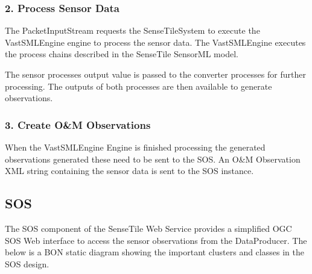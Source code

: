 \documentclass[]{final_report}
\begin{document}
\subsubsection {2. Process Sensor Data}
The PacketInputStream requests the SenseTileSystem to execute
the VastSMLEngine engine to process the sensor data. The VastSMLEngine
executes the process chains described in the SenseTile SensorML model.

The sensor processes output value is passed to the converter processes for further processing. The
outputs of both processes are then available to generate observations.

\subsubsection {3. Create O\&M Observations}

When the VastSMLEngine Engine is finished processing
the generated observations generated these
need to be sent to the SOS. An O\&M Observation
XML string containing the sensor data is sent to
the SOS instance.


\newpage
\subsection {SOS}

The SOS component of the SenseTile Web Service provides a simplified OGC SOS Web interface to access the sensor observations from the DataProducer. The below is a BON static diagram showing the important clusters and classes in the SOS design.
\end{document}
